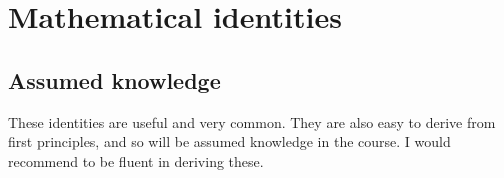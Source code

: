 \documentclass[a4paper]{article}
\theoremstyle{definition}
\begin{document}




\section{Mathematical identities}
\label{sec:identities}
\subsection{Assumed knowledge}
These identities are useful and very common. They are also easy to derive from first principles, and so will be assumed knowledge in the course. I would recommend to be fluent in deriving these.
\end{document}
